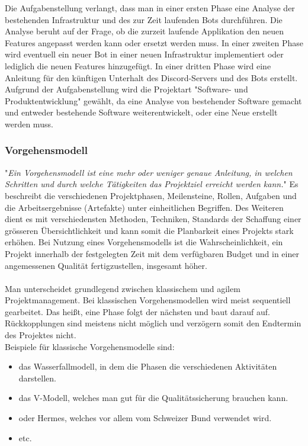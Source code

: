 \documentclass[a4paper, table]{article}
\begin{document}
Die Aufgabenstellung verlangt, dass man in einer ersten Phase eine Analyse der bestehenden Infrastruktur und des zur Zeit laufenden Bots durchführen. 
Die Analyse beruht auf der Frage, ob die zurzeit laufende Applikation den neuen Features angepasst werden kann oder ersetzt werden muss. 
In einer zweiten Phase wird eventuell ein neuer Bot in einer neuen Infrastruktur implementiert oder lediglich die neuen Features hinzugefügt. 
In einer dritten Phase wird eine Anleitung für den künftigen Unterhalt des Discord-Servers und des Bots erstellt.\\
Aufgrund der Aufgabenstellung wird die Projektart "Software- und Produktentwicklung" gewählt, da eine Analyse von bestehender Software gemacht und entweder bestehende Software weiterentwickelt, oder eine Neue erstellt werden muss.

\subsubsection{Vorgehensmodell}\label{Vorgehensmodell}
"\textit{Ein Vorgehensmodell ist eine mehr oder weniger genaue Anleitung, in welchen Schritten und durch welche Tätigkeiten das Projektziel
erreicht werden kann.}"\autocite{sarre_lufthansa-reservierung_2009}
Es beschreibt die verschiedenen Projektphasen, Meilensteine, Rollen, Aufgaben und die Arbeitsergebnisse (Artefakte) unter einheitlichen Begriffen. 
Des Weiteren dient es mit verschiedensten Methoden, Techniken, Standards der Schaffung einer grösseren Übersichtlichkeit und kann somit die Planbarkeit eines Projekts stark erhöhen. 
Bei Nutzung eines Vorgehensmodells ist die Wahrscheinlichkeit, ein Projekt innerhalb der festgelegten Zeit mit dem verfügbaren Budget und in einer angemessenen Qualität fertigzustellen, insgesamt höher. \autocite{jenny_projektmanagement_2016}\\\\ %
Man unterscheidet grundlegend zwischen klassischem und agilem Projektmanagement. 
Bei klassischen Vorgehensmodellen wird meist sequentiell gearbeitet. 
Das heißt, eine Phase folgt der nächsten und baut darauf auf. 
Rückkopplungen sind meistens nicht möglich und verzögern somit den Endtermin des Projektes nicht.\\
Beispiele für klassische Vorgehensmodelle sind:
\begin{itemize}
    \item das Wasserfallmodell, in dem die Phasen die verschiedenen Aktivitäten darstellen.
    \item das V-Modell, welches man gut für die Qualitätssicherung brauchen kann.
    \item oder Hermes, welches vor allem vom Schweizer Bund verwendet wird.
    \item etc.
\end{itemize}
\end{document}
